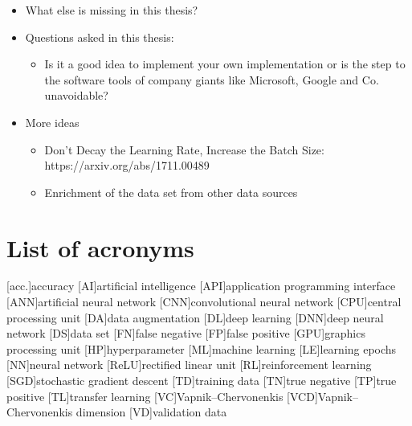 \documentclass[10pt]{article}
\begin{document}
\begin{itemize}
			\item What else is missing in this thesis?
			\item Questions asked in this thesis:
			\begin{itemize}
				\setlength\itemsep{0em}
				\item Is it a good idea to implement your own implementation or is the step to the software tools of company giants like Microsoft, Google and Co. unavoidable?
			\end{itemize}
			\item More ideas
			\begin{itemize}
				\setlength\itemsep{0em}
				\item Don't Decay the Learning Rate, Increase the Batch Size: https://arxiv.org/abs/1711.00489
				\item Enrichment of the data set from other data sources
			\end{itemize}
		\end{itemize}
		
		

	\clearpage
	\section*{List of acronyms}
		\begin{acronym}[General]
			\setlength{\itemsep}{0em}
			[acc.]{accuracy}
			[AI]{artificial intelligence}
			[API]{application programming interface}
			[ANN]{artificial neural network}
			[CNN]{convolutional neural network}
			[CPU]{central processing unit}
			[DA]{data augmentation}
			[DL]{deep learning}
			[DNN]{deep neural network}
			[DS]{data set}
			[FN]{false negative}
			[FP]{false positive}
			[GPU]{graphics processing unit}
			[HP]{hyperparameter}
			[ML]{machine learning}
			[LE]{learning epochs}
			[NN]{neural network}
			[ReLU]{rectified linear unit}
			[RL]{reinforcement learning}
			[SGD]{stochastic gradient descent}
			[TD]{training data}
			[TN]{true negative}
			[TP]{true positive}
			[TL]{transfer learning}
			[VC]{Vapnik–Chervonenkis}
			[VCD]{Vapnik–Chervonenkis dimension}
			[VD]{validation data}
		\end{acronym}
		
\end{document}
